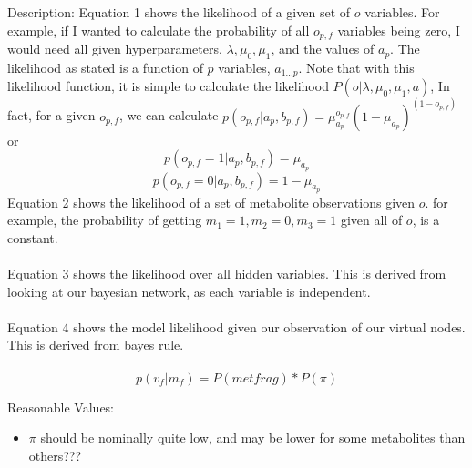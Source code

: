 \documentclass[11pt]{article}
\begin{document}
Description:
Equation 1 shows the likelihood of a given set of $o$ variables. For example, if I wanted to calculate the probability of all $o_{p,f}$ variables being zero, I would need all given hyperparameters, $\lambda, \mu_0, \mu_1$, and the values of $a_p$. The likelihood as stated is a function of $p$ variables, $a_{1...p}$. Note that with this likelihood function, it is simple to calculate the likelihood $P(o | \lambda, \mu_0, \mu_1, a)$, In fact, for a given $o_{p,f}$, we can calculate $p(o_{p,f} | a_p, b_{p,f}) = \mu_{a_p}^{o_{p,f}} (1-\mu_{a_p})^{(1-o_{p,f})}$ or 
$$p(o_{p,f} = 1 | a_p, b_{p,f}) = \mu_{a_p}$$
$$p(o_{p,f} = 0 | a_p, b_{p,f}) = 1-\mu_{a_p}$$
Equation 2 shows the likelihood of a set of metabolite observations given $o$. for example, the probability of getting $m_1 = 1, m_2 = 0, m_3 = 1$ given all of $o$, is a constant.\\\\
Equation 3 shows the likelihood over all hidden variables. This is derived from looking at our bayesian network, as each variable is independent.\\\\
Equation 4 shows the model likelihood given our observation of our virtual nodes. This is derived from bayes rule. \\\\

$$p(v_f | m_f) = P(metfrag)  * P(\pi)$$

Reasonable Values:
\begin{itemize}
\item $\pi$ should be nominally quite low, and may be lower for some metabolites than others???
\end{itemize}
\end{document}
